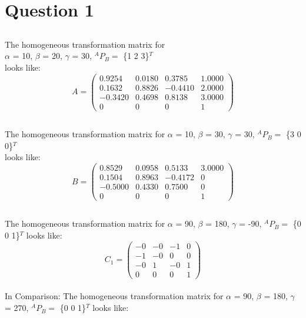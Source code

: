 \newpage
\section{Question 1}
	
	
	\subsection{}	%
		The homogeneous transformation matrix for\\
		$\alpha$ = 10\degree, 
		$\beta$ = 20\degree, 
		$\gamma$ = 30\degree, $^{A}P_{B} =$ \{1 2 3\}$^{T}$\\
		looks like:\\
	
		$$
		A =
		\begin{pmatrix}
			0.9254 & 0.0180 & 0.3785 & 1.0000\\
			0.1632 & 0.8826 & -0.4410 & 2.0000\\
			-0.3420  & 0.4698  & 0.8138 & 3.0000\\
			0 & 0 & 0 & 1
		\end{pmatrix}
		$$
		
	\subsection{}	%
		The homogeneous transformation matrix for\newline
		$\alpha$ = 10\degree, 
		$\beta$ = 30\degree, 
		$\gamma$ = 30\degree, $^{A}P_{B} =$ \{3 0 0\}$^{T}$\\
		looks like:\\
		
		$$
		B =
		\begin{pmatrix}
			0.8529 & 0.0958 & 0.5133 & 3.0000\\
			0.1504 & 0.8963 & -0.4172 & 0\\
			-0.5000  & 0.4330  & 0.7500 & 0\\
			0 & 0 & 0 & 1
		\end{pmatrix}
		$$		
	\subsection{}	%
		The homogeneous transformation matrix for\newline
		$\alpha$ = 90\degree, 
		$\beta$ = 180\degree, 
		$\gamma$ = -90\degree, $^{A}P_{B} =$ \{0 0 1\}$^{T}$\newline
		looks like:\\
		
		$$
		C_{1} =
		\begin{pmatrix}
			-0 & -0 & -1 & 0\\
			-1 & -0 & 0 & 0\\
			-0  & 1  & -0 & 1\\
			0 & 0 & 0 & 1
		\end{pmatrix}
		$$		
		\\
		In Comparison:
		The homogeneous transformation matrix for\newline
		$\alpha$ = 90\degree, 
		$\beta$ = 180\degree, 
		$\gamma$ = 270\degree, $^{A}P_{B} =$ \{0 0 1\}$^{T}$\newline
		looks like:\\
		
